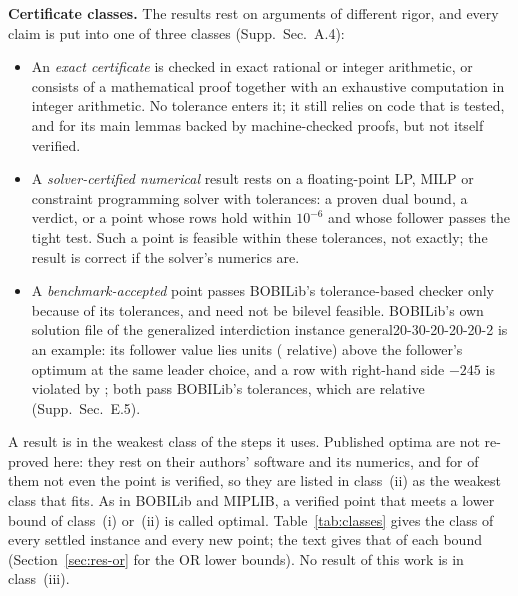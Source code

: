 \documentclass[]{spie}  %
\theoremstyle{plain}
\newcommand{\supp}[1]{Supp.\ Sec.~#1}
\newcommand{\inst}[1]{\mbox{#1}}             %
\newcommand{\cls}[1]{class~(#1)}             %
\begin{document}
\textbf{Certificate classes.} The results rest on arguments of different rigor, and every claim
is put into one of three classes (\supp{A.4}):
\begin{itemize}
\item[(i)] An \emph{exact certificate} is checked in exact rational or integer arithmetic, or
consists of a mathematical proof together with an exhaustive computation in integer arithmetic.
No tolerance enters it; it still relies on code that is tested, and for its main lemmas backed by
machine-checked proofs, but not itself verified.
\item[(ii)] A \emph{solver-certified numerical} result rests on a floating-point LP, MILP or
constraint programming solver with tolerances: a proven dual bound, a verdict, or a point whose
rows hold within $10^{-6}$ and whose follower passes the tight test. Such a point is feasible within
these tolerances, not exactly; the result is correct if the solver's numerics are.
\item[(iii)] A \emph{benchmark-accepted} point passes BOBILib's tolerance-based checker only
because of its tolerances, and need not be bilevel feasible. BOBILib's own solution file of the
generalized interdiction instance \inst{general20-30-20-20-20-2} is an example: its follower
value \GenTolPhiSol{} lies \GenTolDiff{} units (\GenTolRel{} relative) above the follower's
optimum \GenTolPhiOpt{} at the same leader choice, and a row with right-hand side $-245$ is
violated by \GenTolViolation{}; both pass BOBILib's tolerances, which are relative (\supp{E.5}).
\end{itemize}
A result is in the weakest class of the steps it uses. Published optima are not re-proved here: they
rest on their authors' software and its numerics, and for \NumLitNoFile{} of them not even the point
is verified, so they are listed in \cls{ii} as the weakest class that fits. As in BOBILib and MIPLIB,
a verified point that meets a lower bound of \cls{i} or~(ii) is called optimal.
Table~\ref{tab:classes} gives the class of every settled instance and every new point; the text
gives that of each bound (Section~\ref{sec:res-or} for the OR lower bounds). No result of this work
is in \cls{iii}.
\end{document}

